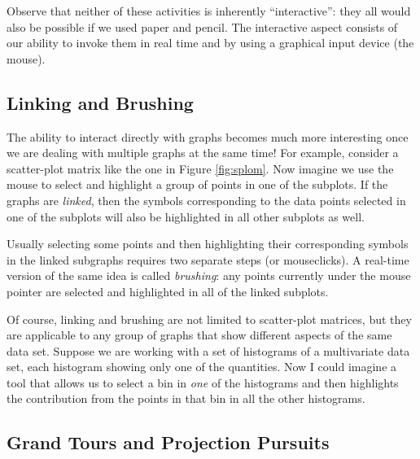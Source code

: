 Observe that neither of these activities is inherently
``interactive'': they all would also be possible if we used paper and
pencil. The interactive aspect consists of our ability to invoke them
in real time and by using a graphical input device (the mouse).

\vspace*{-9pt}
\subsection{Linking and Brushing}

  
The ability to interact directly with graphs becomes much more
interesting once we are dealing with multiple graphs at the same time!
For example, consider a scatter-plot matrix like the one in Figure
\ref{fig:splom}. Now imagine we use the mouse to select and highlight
a group of points in one of the subplots. If the graphs are
\emph{linked}, then the symbols corresponding to the data points
selected in one of the subplots will also be highlighted in all other
subplots as well.


Usually selecting some points and then highlighting their
corresponding symbols in the linked subgraphs requires two separate
steps (or mouseclicks). A real-time version of the same idea is called
\emph{brushing}: any points currently under the mouse pointer are
selected and highlighted in all of the linked subplots.

Of course, linking and brushing are not limited to scatter-plot
matrices, but they are applicable to any group of graphs that show
different aspects of the same data set.  Suppose we are working with a
set of histograms of a multivariate data set, each histogram showing
only one of the quantities.  Now I could imagine a tool that allows us
to select a bin in \emph{one} of the histograms and then highlights
the contribution from the points in that bin in all the other
histograms.

\vspace*{-9pt}
\subsection{Grand Tours and Projection Pursuits}

 
